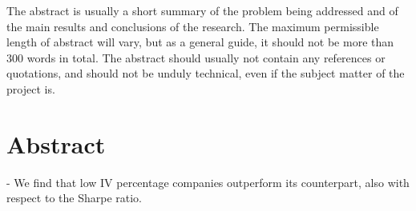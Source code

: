 The abstract is usually a short summary of the problem being addressed and of the main results and conclusions of the research. The maximum permissible length of abstract will vary, but as a general guide, it should not be more than 300 words in total. The abstract should usually not contain any references or quotations, and should not be unduly technical, even if the subject matter of the project is.

\chapter{Abstract}

- We find that low IV percentage companies outperform its counterpart, also with respect to the Sharpe ratio. 
